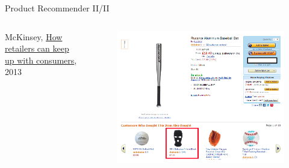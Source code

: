 \documentclass[main.tex]{subfiles}
\begin{document}
\begin{frame}{Product Recommender II/II}
\begin{columns}
\begin{column}{.6\textwidth}
\begin{justify}
                    McKinsey, \href{https://www.mckinsey.com/industries/retail/our-insights/how-retailers-can-keep-up-with-consumers}{How retailers can keep up with consumers}, 2013
                \end{justify}
            \end{column}
            \begin{column}{.4\textwidth}
                \begin{figure}
                    \label{fig:amazon-recommendation}
                    \includegraphics[width=\textwidth, cframe=gray]{figures/external/amazon-recommendations.png}
                \end{figure}
            \end{column}
        \end{columns}
    \end{frame}
    
\end{document}
